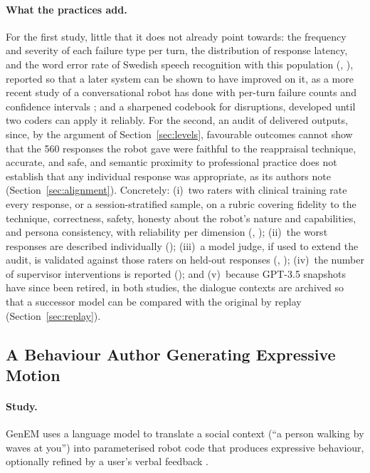 \paragraph{What the practices add.} For the first study, little that it
does not already point towards: the frequency and severity of each failure
type per turn, the distribution of response latency, and the word error
rate of Swedish speech recognition with this population
(, ), reported so that a later system can
be shown to have improved on it, as a more recent study of a conversational
robot has done with per-turn failure counts and confidence intervals
\cite{satake2026focus}; and a sharpened codebook for disruptions, developed
until two coders can apply it reliably. For the second, an audit of delivered
outputs, since, by the argument of Section~\ref{sec:levels}, favourable
outcomes cannot show that the 560 responses the robot gave were faithful to
the reappraisal technique, accurate, and safe, and semantic proximity to
professional practice does not establish that any individual response was
appropriate, as its authors note (Section~\ref{sec:alignment}). Concretely:
(i)~two raters with clinical training rate every response, or a
session-stratified sample, on a rubric covering fidelity to the technique,
correctness, safety, honesty about the robot's nature and capabilities, and
persona consistency, with reliability per dimension (,
); (ii)~the worst responses are described individually
(); (iii)~a model judge, if used to extend the audit, is
validated against those raters on held-out responses (,
); (iv)~the number of supervisor interventions is reported
(); and (v)~because GPT-3.5 snapshots have since been
retired, in both studies, the dialogue contexts are archived so that a
successor model can be compared with the original by replay
(Section~\ref{sec:replay}).

\subsection{A Behaviour Author Generating Expressive Motion}
\label{sec:exGenEM}

\paragraph{Study.} GenEM uses a language model to translate a social
context (``a person walking by waves at you'') into parameterised robot
code that produces expressive behaviour, optionally refined by a user's
verbal feedback \cite{mahadevan2024generative}.

